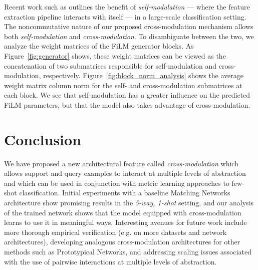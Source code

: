 \documentclass{article}
\begin{document}
Recent work such as \cite{hu17squeeze} outlines the benefit of
{\em self-modulation} --- where the feature extraction pipeline interacts
with itself --- in a large-scale classification setting. The noncommutative
nature of our proposed cross-modulation mechanism allows both
{\em self-modulation} and {\em cross-modulation}. To disambiguate
between the two, we analyze the weight matrices of
the FiLM generator blocks. As Figure~\ref{fig:generator} shows, these
weight matrices can be viewed as the concatenation of two submatrices
responsible for self-modulation and cross-modulation, respectively.
Figure~\ref{fig:block_norm_analysis} shows the average weight matrix
column norm for the self- and cross-modulation submatrices at each
block. We see that self-modulation has a greater influence on the
predicted FiLM parameters, but that the model also takes advantage
of cross-modulation.


\section{Conclusion}

We have proposed a new architectural feature called {\em cross-modulation}
which allows support and query examples to interact at multiple levels of
abstraction and which can be used in conjunction with metric learning
approaches to few-shot classification. Initial experiments with a baseline
Matching Networks architecture show promising results in the {\em 5-way, 1-shot}
setting, and our analysis of the trained network shows that the model equipped
with cross-modulation learns to use it in meaningful ways. Interesting avenues
for future work include more thorough empirical verification (e.g. on more
datasets and network architectures), developing analogous cross-modulation
architectures for other methods such as Prototypical Networks, and addressing
scaling issues associated with the use of pairwise interactions at multiple
levels of abstraction.

\newpage



\end{document}
